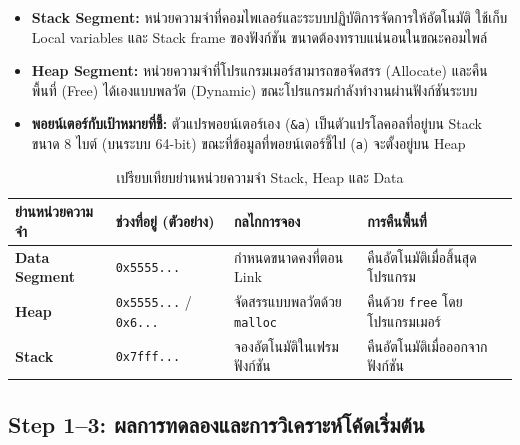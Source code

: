 \documentclass[a4paper,11pt]{article}
\newcommand{\code}[1]{\texttt{#1}}
\begin{document}
\begin{itemize}[leftmargin=*]
  \item \textbf{Stack Segment:} หน่วยความจำที่คอมไพเลอร์และระบบปฏิบัติการจัดการให้อัตโนมัติ ใช้เก็บ Local variables และ Stack frame ของฟังก์ชัน ขนาดต้องทราบแน่นอนในขณะคอมไพล์
  \item \textbf{Heap Segment:} หน่วยความจำที่โปรแกรมเมอร์สามารถขอจัดสรร (Allocate) และคืนพื้นที่ (Free) ได้เองแบบพลวัต (Dynamic) ขณะโปรแกรมกำลังทำงานผ่านฟังก์ชันระบบ
  \item \textbf{พอยน์เตอร์กับเป้าหมายที่ชี้:} ตัวแปรพอยน์เตอร์เอง (\code{\&a}) เป็นตัวแปรโลคอลที่อยู่บน Stack ขนาด 8 ไบต์ (บนระบบ 64-bit) ขณะที่ข้อมูลที่พอยน์เตอร์ชี้ไป (\code{a}) จะตั้งอยู่บน Heap
\end{itemize}

\begin{table}[H]
\centering\small
\caption{เปรียบเทียบย่านหน่วยความจำ Stack, Heap และ Data}
\begin{tabular}{p{2.8cm}p{3.2cm}p{4.0cm}p{4.2cm}}
\toprule
\textbf{ย่านหน่วยความจำ} & \textbf{ช่วงที่อยู่ (ตัวอย่าง)} & \textbf{กลไกการจอง} & \textbf{การคืนพื้นที่} \\
\midrule
\textbf{Data Segment} & \code{0x5555...} & กำหนดขนาดคงที่ตอน Link & คืนอัตโนมัติเมื่อสิ้นสุดโปรแกรม \\
\textbf{Heap} & \code{0x5555...} / \code{0x6...} & จัดสรรแบบพลวัตด้วย \code{malloc} & คืนด้วย \code{free} โดยโปรแกรมเมอร์ \\
\textbf{Stack} & \code{0x7fff...} & จองอัตโนมัติในเฟรมฟังก์ชัน & คืนอัตโนมัติเมื่อออกจากฟังก์ชัน \\
\bottomrule
\end{tabular}
\end{table}

\subsection{Step 1--3: ผลการทดลองและการวิเคราะห์โค้ดเริ่มต้น}
\end{document}
